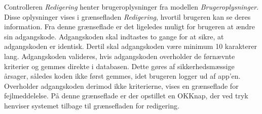 \noindent
Controlleren \textit{Redigering} henter brugeroplysninger fra modellen \textit{Brugeroplysninger}. Disse oplysninger vises i grænsefladen \textit{Redigering}, hvortil brugeren kan se deres information. Fra denne grænseflade er det ligeledes muligt for brugeren at ændre sin adgangskode. Adgangskoden skal indtastes to gange for at sikre, at adgangskoden er identisk. Dertil skal adgangskoden være minimum 10 karakterer lang. Adgangskoden valideres, hvis adgangskoden overholder de førnævnte kriterier og gemmes direkte i databasen. Dette gøres af sikkerhedsmæssige årsager, således koden ikke først gemmes, idet brugeren logger ud af app'en. 
Overholder adgangskoden derimod ikke kriterierne, vises en grænseflade for fejlmeddelelse. På denne grænseflade er der opstillet en OKKnap, der ved tryk henviser systemet tilbage til grænsefladen for redigering. 
